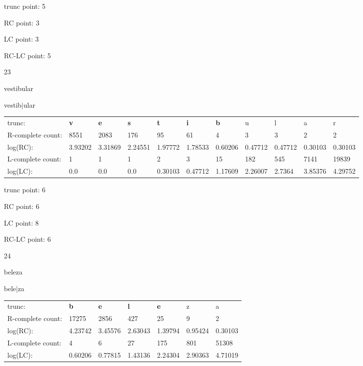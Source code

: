 \documentclass{article}
\begin{document}
trunc point: 5

RC point: 3

LC point: 3

RC-LC point: 5

\vspace{3em}



23

vestibular

vestib$|$ular

\vspace{1em}

\begin{tabular}{l|llllllllll}

trunc: & {\color{red}\bf v} & {\color{red}\bf e} & {\color{red}\bf s} & {\color{red}\bf t} & {\color{red}\bf i} & {\color{red}\bf b} & u & l & a & r \\ 
R-complete count: & 8551 & 2083 & 176 & 95 & 61 & 4 & 3 & 3 & 2 & 2 \\ 
log(RC): & 3.93202 & 3.31869 & 2.24551 & 1.97772 & 1.78533 & 0.60206 & 0.47712 & 0.47712 & 0.30103 & 0.30103 \\ 
L-complete count: & 1 & 1 & 1 & 2 & 3 & 15 & 182 & 545 & 7141 & 19839 \\ 
log(LC): & 0.0 & 0.0 & 0.0 & 0.30103 & 0.47712 & 1.17609 & 2.26007 & 2.7364 & 3.85376 & 4.29752 \\ 
\end{tabular}

trunc point: 6

RC point: 6

LC point: 8

RC-LC point: 6

\vspace{3em}



24

beleza

bele$|$za

\vspace{1em}

\begin{tabular}{l|llllll}

trunc: & {\color{red}\bf b} & {\color{red}\bf e} & {\color{red}\bf l} & {\color{red}\bf e} & z & a \\ 
R-complete count: & 17275 & 2856 & 427 & 25 & 9 & 2 \\ 
log(RC): & 4.23742 & 3.45576 & 2.63043 & 1.39794 & 0.95424 & 0.30103 \\ 
L-complete count: & 4 & 6 & 27 & 175 & 801 & 51308 \\ 
log(LC): & 0.60206 & 0.77815 & 1.43136 & 2.24304 & 2.90363 & 4.71019 \\ 
\end{tabular}
\end{document}
